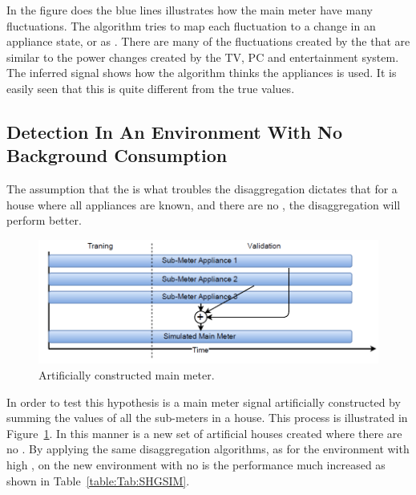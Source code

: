 In the figure does the blue lines illustrates how the main meter have many fluctuations. The algorithm tries to map each fluctuation to a change in an appliance state, or as . There are many of the fluctuations created by the  that are similar to the power changes created by the TV, PC and entertainment system. The inferred signal shows how the algorithm thinks the appliances is used. It is easily seen that this is quite different from the true values. 

\subsection{Detection In An Environment With No Background Consumption}
\label{sec:NOISEFREE}
The assumption that the  is what troubles the disaggregation dictates that for a house where all appliances are known, and there are no , the disaggregation will perform better. 

\begin{figure}[H]
\centering
\includegraphics[width=1\textwidth]{billeder/SimIllu.png}
\caption{Artificially constructed main meter.}
\label{fig:SIL}
\end{figure}

In order to test this hypothesis is a main meter signal artificially constructed by summing the values of all the sub-meters in a house. This process is illustrated in Figure~\ref{fig:SIL}. In this manner is a new set of artificial houses created where there are no . By applying the same disaggregation algorithms, as for the environment with high , on the new environment with no  is the performance much increased as shown in Table~\ref{table:Tab:SHGSIM}.

  

